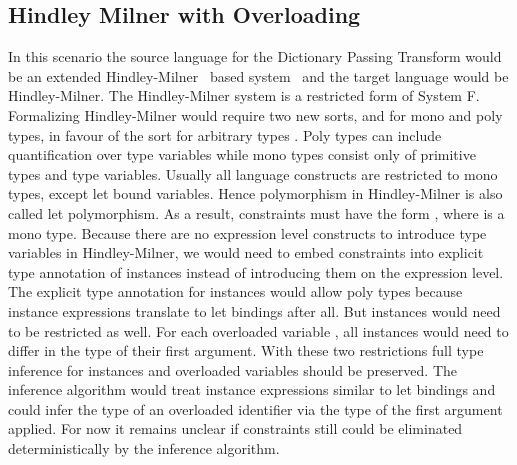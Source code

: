 \subsection{Hindley Milner with Overloading}\label{sec:hm}
In this scenario the source language for the Dictionary Passing Transform would be an extended Hindley-Milner~\cite{hm} based system \HMo\ and the target language would be Hindley-Milner. 
The Hindley-Milner system is a restricted form of System F. Formalizing Hindley-Milner would require two new sorts,  and  for mono and poly types, in favour of the sort for arbitrary types . 
Poly types can include quantification over type variables while mono types consist only of primitive types and type variables. 
Usually all language constructs are restricted to mono types, except let bound variables. 
Hence polymorphism in Hindley-Milner is also called let polymorphism.  
As a result, constraints must have the form  \Constr{:} , where  is a mono type. 
Because there are no expression level constructs to introduce type variables in Hindley-Milner, we would need to embed constraints into explicit type annotation of instances instead of introducing them on the expression level. 
The explicit type annotation for instances would allow poly types because instance expressions translate to let bindings after all.
But instances would need to be restricted as well. For each overloaded variable , all instances would need to differ in the type of their first argument.
With these two restrictions full type inference for instances and overloaded variables should be preserved.
The inference algorithm would treat instance expressions similar to let bindings and could infer the type of an overloaded identifier via the type of the first argument applied. For now it remains unclear if constraints still could be eliminated deterministically by the inference algorithm.

